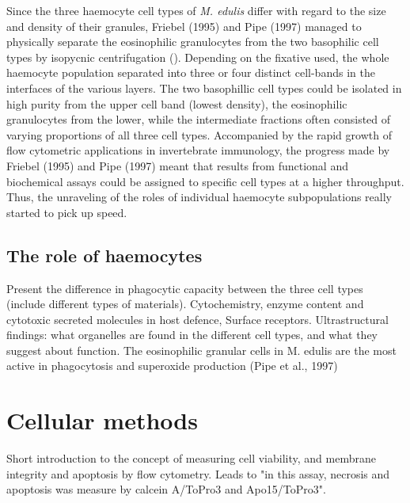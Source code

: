 Since the three haemocyte cell types of \emph{M. edulis} differ with regard to the size and density of their granules, Friebel (1995) and Pipe (1997) managed to physically separate the eosinophilic granulocytes from the two basophilic cell types by isopycnic centrifugation (\cite{Friebel1995, Pipe1997}). Depending on the fixative used, the whole haemocyte population separated into three or four distinct cell-bands in the interfaces of the various layers. The two basophillic cell types could be isolated in high purity from the upper cell band (lowest density), the eosinophilic granulocytes from the lower, while the intermediate fractions often consisted of varying proportions of all three cell types. Accompanied by the rapid growth of flow cytometric applications in invertebrate immunology, the progress made by Friebel (1995) and Pipe (1997) meant that results from functional and biochemical assays could be assigned to specific cell types at a higher throughput. Thus, the unraveling of the roles of individual haemocyte subpopulations really started to pick up speed.

\subsection{The role of haemocytes}
Present the difference in phagocytic capacity between the three cell types (include different types of materials).
Cytochemistry, enzyme content and cytotoxic secreted molecules in host defence, Surface receptors.
Ultrastructural findings: what organelles are found in the different cell types, and what they suggest about function.
The  eosinophilic granular cells in  M. edulis are the most active in phagocytosis and superoxide production (Pipe  et al., 1997)




























\section{Cellular methods}
Short introduction to the concept of measuring cell viability, and membrane integrity and apoptosis by flow cytometry. Leads to "in this assay, necrosis and apoptosis was measure by calcein A/ToPro3 and Apo15/ToPro3".

